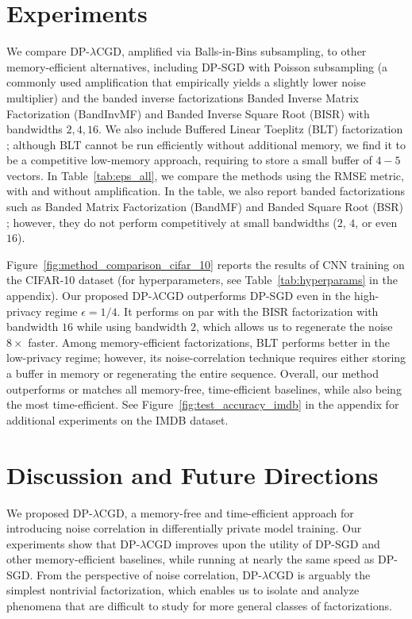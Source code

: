 \documentclass{article}
\theoremstyle{plain}
\theoremstyle{definition}
\theoremstyle{remark}
\newcommand{\method}{DP-$\lambda$CGD\xspace}
\begin{document}
\section{Experiments}
We compare \method, amplified via Balls-in-Bins subsampling, to other memory-efficient alternatives, including DP-SGD with Poisson subsampling (a commonly used amplification that empirically yields a slightly lower noise multiplier) and the banded inverse factorizations Banded Inverse Matrix Factorization (BandInvMF) and Banded Inverse Square Root (BISR) \citep{kalinin2025back} with bandwidths $2,4,16$.
 We also include Buffered Linear Toeplitz (BLT)  factorization \citep{dvijotham2024efficient}; although BLT cannot be run efficiently without additional memory, we find it to be a competitive low-memory approach, requiring to store a small buffer of $4-5$ vectors. In Table~\ref{tab:eps_all}, we compare the methods using the RMSE metric, with and without amplification. In the table, we also report banded factorizations such as Banded Matrix Factorization (BandMF) \citep{scalingmckenna2024} and Banded Square Root (BSR) \citep{kalinin2024}; however, they do not perform competitively at small bandwidths ($2$, $4$, or even $16$).

Figure~\ref{fig:method_comparison_cifar_10}
reports the results of CNN training on the 
CIFAR-10 dataset (for hyperparameters, see Table~\ref{tab:hyperparams} in the appendix).
%
Our proposed \method outperforms DP-SGD even in the high-privacy regime $\epsilon=1/4$. It performs on par with the BISR factorization with bandwidth $16$ while using bandwidth $2$, which allows us to regenerate the noise $8\times$ faster. Among memory-efficient factorizations, BLT performs better in the low-privacy regime; however, its noise-correlation technique requires either storing a buffer in memory or regenerating the entire sequence. Overall, our method outperforms or matches all memory-free, time-efficient baselines, while also being the most time-efficient. See Figure~\ref{fig:test_accuracy_imdb} in the appendix for additional experiments on the IMDB dataset.



\section{Discussion and Future Directions}

We proposed \method, a memory-free and time-efficient approach for introducing noise
correlation in differentially private model training. Our experiments show that \method
improves upon the utility of DP-SGD and other memory-efficient baselines, while running
at nearly the same speed as DP-SGD. From the perspective of noise correlation, \method
is arguably the simplest nontrivial factorization, which enables us to isolate and
analyze phenomena that are difficult to study for more
general classes of factorizations.
\end{document}
